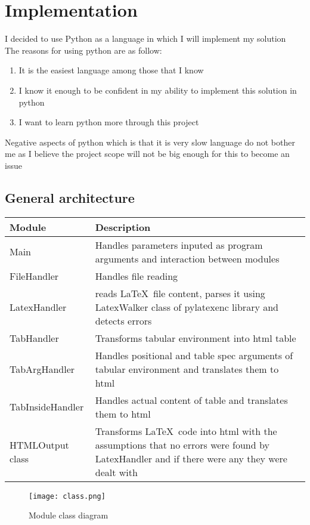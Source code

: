 \documentclass[12pt]{article}
\begin{document}
\section{Implementation}
I decided to use Python as a language in which I will implement my solution \\ 
The reasons for using python are as follow:
\begin{enumerate}
    \item It is the easiest language among those that I know
    \item I know it enough to be confident in my ability to implement this solution in python
    \item I want to learn python more through this project
\end{enumerate}
Negative aspects of python which is that it is very slow language do not bother me as I believe the project scope will not be big enough for this to become an issue
  
\subsection{General architecture}
\begin{tabular}{|l|p{10cm}|}
    \hline 
    Module & Description \\ 
    \hline 
    Main & Handles parameters inputed as program arguments and interaction between modules \\
    \hline
    FileHandler & Handles file reading \\ 
    \hline 
    LatexHandler & reads \LaTeX \, file content, parses it using LatexWalker class of pylatexenc library and detects errors \\
    \hline
    TabHandler & Transforms tabular environment into html table
    \\
    \hline
    TabArgHandler & Handles positional and table spec arguments of tabular environment and translates them to html \\ 
    \hline
    TabInsideHandler & Handles actual content of table and translates them to html \\
    \hline
    HTMLOutput class &  Transforms \LaTeX \, code into html with the assumptions that no errors were found by LatexHandler and if there were any they were dealt with \\ 
    \hline
\end{tabular}


\begin{figure}[h]
    \caption{Module class diagram}
    \texttt{[image: class.png]}
\end{figure}
    
\end{document}
